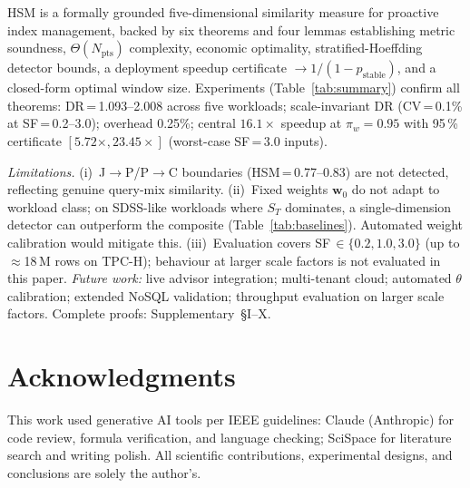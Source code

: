 \documentclass[10pt,twocolumn,a4paper]{article}
\newcommand{\ST}{S_{T}}
\newcommand{\Npts}{N_{\mathrm{pts}}}
\begin{document}
HSM is a formally grounded five-dimensional similarity measure for
proactive index management, backed by six theorems and four lemmas
establishing metric soundness, $\Theta(\Npts)$ complexity, economic
optimality, stratified-Hoeffding detector bounds, a deployment
speedup certificate $\to\!1/(1{-}p_{\mathrm{stable}})$, and a
closed-form optimal window size.
Experiments (Table~\ref{tab:summary}) confirm all theorems: DR\,=\,1.093--2.008
across five workloads; scale-invariant DR (CV\,=\,0.1\% at SF\,=\,0.2--3.0); overhead 0.25\%;
central $16.1\times$ speedup at $\pi_w\!=\!0.95$ with 95\,\% certificate
$[5.72\times,23.45\times]$ (worst-case SF\,=\,3.0 inputs).

\textit{Limitations.}
(i)~J$\to$P/P$\to$C boundaries (HSM\,=\,0.77--0.83) are not detected,
reflecting genuine query-mix similarity.
(ii)~Fixed weights $\mathbf{w}_0$ do not adapt to workload class;
on SDSS-like workloads where $\ST$ dominates, a single-dimension
detector can outperform the composite (Table~\ref{tab:baselines}).
Automated weight calibration would mitigate this.
(iii)~Evaluation covers SF\,$\in\{0.2,1.0,3.0\}$ (up to $\approx$18\,M
rows on TPC-H); behaviour at larger scale factors is not evaluated in
this paper.
\textit{Future work:} live advisor integration; multi-tenant cloud;
automated $\theta$ calibration; extended NoSQL validation;
throughput evaluation on larger scale factors.
Complete proofs: Supplementary~\S I--X.

\section*{Acknowledgments}
This work used generative AI tools per IEEE guidelines:
Claude (Anthropic) for code review, formula verification, and language checking;
SciSpace for literature search and writing polish.
All scientific contributions, experimental designs, and conclusions are solely the author's.



\balance
\end{document}
